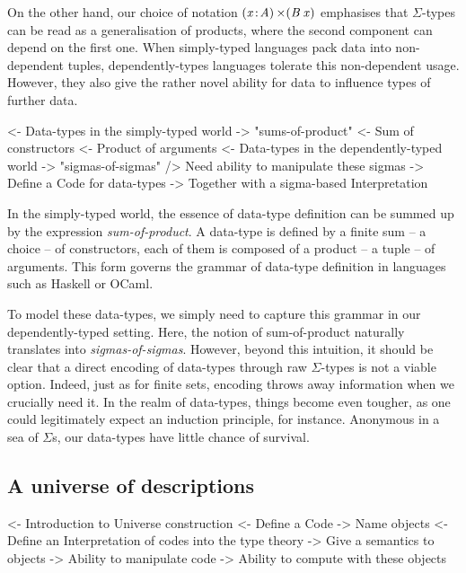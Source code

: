 On the other hand, our choice of notation $\SIGMA{\V{x}}{\V{A}} (\V{B}\:\V{x})$
emphasises that $\Sigma$-types can be read as a generalisation of products,
where the second component can depend on the first one. When simply-typed
languages pack data into non-dependent tuples, dependently-types languages
tolerate this non-dependent usage. However, they also give the rather novel
ability for data to influence types of further data.

\begin{wstructure}
<- Data-types in the simply-typed world
    -> "sums-of-product"
        <- Sum of constructors
        <- Product of arguments
<- Data-types in the dependently-typed world
    -> "sigmas-of-sigmas"
    /> Need ability to manipulate these sigmas
        -> Define a Code for data-types
        -> Together with a sigma-based Interpretation
\end{wstructure}

In the simply-typed world, the essence of data-type definition can be
summed up by the expression \emph{sum-of-product}. A data-type is defined
by a finite sum -- a choice -- of constructors, each of them is
composed of a product -- a tuple -- of arguments. This form governs
the grammar of data-type definition in languages such as Haskell or
OCaml.

To model these data-types, we simply need to capture this grammar in
our dependently-typed setting. Here, the notion of sum-of-product
naturally translates into \emph{sigmas-of-sigmas}. However, beyond
this intuition, it should be clear that a direct encoding of
data-types through raw $\Sigma$-types is not a viable option. Indeed,
just as for finite sets, encoding throws away information when we
crucially need it. In the realm of data-types, things become even
tougher, as one could legitimately expect an induction principle, for
instance. Anonymous in a sea of $\Sigma$s, our data-types have little
chance of survival. 


\subsection{A universe of descriptions}
\label{sec:desc-universe}

\begin{wstructure}
<- Introduction to Universe construction
    <- Define a Code
        -> Name objects
    <- Define an Interpretation of codes into the type theory
        -> Give a semantics to objects
    -> Ability to manipulate code
    -> Ability to compute with these objects
\end{wstructure}

